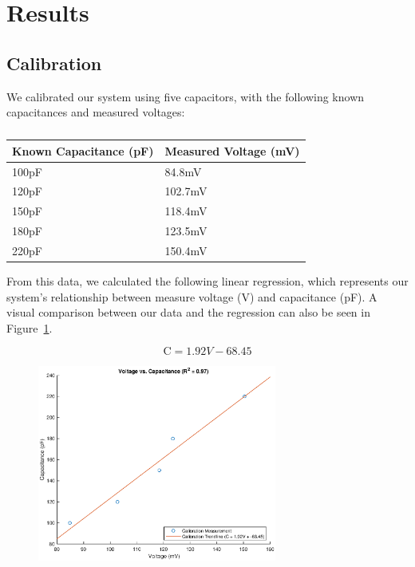 \documentclass[11pt]{article}
\begin{document}
\section{Results}

\subsection{Calibration}

We calibrated our system using five capacitors, with the following known capacitances and measured voltages:

\begin{table}[H]
    \centering
    \begin{tabular}{ll}
    \hline
    \multicolumn{1}{c}{\textbf{Known Capacitance (pF)}} & \multicolumn{1}{c}{\textbf{Measured Voltage (mV)}} \\ \hline
    100pF &  84.8mV \\
    120pF & 102.7mV \\
    150pF & 118.4mV \\
    180pF & 123.5mV \\
    220pF & 150.4mV \\ \hline
    \end{tabular}
    \caption{}
    \label{table:calibration}
\end{table}

From this data, we calculated the following linear regression, which represents our system's relationship between measure voltage (V) and capacitance (pF). A visual comparison between our data and the regression can also be seen in Figure~\ref{fig:calibration}.

\begin{equation}
    \text{C} = 1.92V - 68.45
\end{equation}

\begin{figure}[H]
	\centering 
	\includegraphics[width=0.7\textwidth]{calibration.eps}
	\caption{}
	\label{fig:calibration}
\end{figure}
\end{document}
